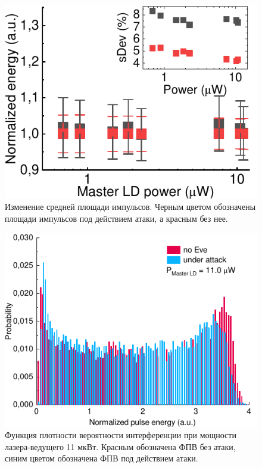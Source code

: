 \begin{figure}%
	\includegraphics[width=\linewidth]{images/area_under_attack.pdf}
	\caption{Изменение средней площади импульсов. Черным цветом обозначены площади импульсов под действием атаки, а красным без нее.}
\end{figure}
\label{fig:area}

\begin{figure}
	\includegraphics[width=\linewidth]{images/hist_attack_11.pdf}
	\caption{Функция плотности вероятности интерференции при мощности лазера-ведущего 11 мкВт. Красным обозначена ФПВ без атаки, синим цветом обозначена ФПВ под действием атаки.}
\end{figure}
\label{fig:histogram_max}

